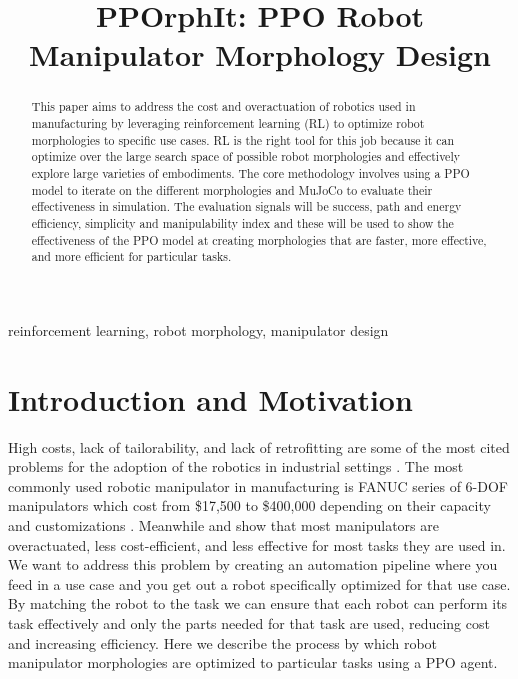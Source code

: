 \documentclass[conference]{IEEEtran}
\begin{document}
\title{PPOrphIt: PPO Robot Manipulator Morphology Design}

\author{
\and
{}
}

\maketitle

\begin{abstract}
This paper aims to address the cost and overactuation of robotics used in manufacturing by leveraging reinforcement learning (RL) to optimize robot morphologies to specific use cases.
RL is the right tool for this job because it can optimize over the large search space of possible robot morphologies and effectively explore large varieties of embodiments.
The core methodology involves using a PPO model to iterate on the different morphologies and MuJoCo to evaluate their effectiveness in simulation.
The evaluation signals will be success, path and energy efficiency, simplicity and manipulability index and these will be used to show the effectiveness of the PPO model at creating morphologies that are faster, more effective, and more efficient for particular tasks.
\end{abstract}

\begin{IEEEkeywords}
reinforcement learning, robot morphology, manipulator design
\end{IEEEkeywords}

\section{Introduction and Motivation}
High costs, lack of tailorability, and lack of retrofitting are some of the most cited problems for the adoption of the robotics in industrial settings \cite{mckinsey2019industrial}.
The most commonly used robotic manipulator in manufacturing is FANUC series of 6-DOF manipulators which cost from \$17,500 to \$400,000 depending on their capacity and customizations \cite{standardbots2025fanucprice}\cite{patentpc2025toprobotics}.
Meanwhile \cite{russo2021task} and \cite{he2019underactuated} show that most manipulators are overactuated, less cost-efficient, and less effective for most tasks they are used in.
We want to address this problem by creating an automation pipeline where you feed in a use case and you get out a robot specifically optimized for that use case.
By matching the robot to the task we can ensure that each robot can perform its task effectively and only the parts needed for that task are used, reducing cost and increasing efficiency.
Here we describe the process by which robot manipulator morphologies are optimized to particular tasks using a PPO agent.
\end{document}

